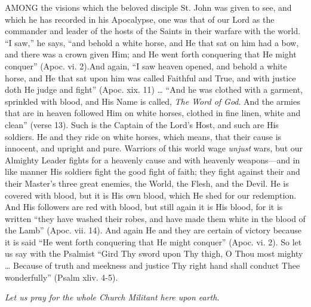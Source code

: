 AMONG the visions
which the beloved disciple St. John was given to see, and which he has
recorded in his Apocalypse, one was that of our Lord as the commander
and leader of the hosts of the Saints in their warfare with the world. ``I
saw,'' he says, ``and behold a white horse, and He that sat on him had a
bow, and there was a crown given Him; and He went forth conquering that
He might conquer'' (Apoc. vi. 2).\emph{}And again, ``I saw heaven opened,
and behold a white horse, and He that sat upon him was called Faithful
and True, and with justice doth He judge and fight'' (Apoc. xix. 11) … ``And
he was clothed with a garment, sprinkled with blood, and His Name is
called, \emph{The Word of God}. And the armies that are in heaven
followed Him on white horses, clothed in fine linen, white and clean''
(verse 13). Such is the Captain of the Lord's Host, and such are His
soldiers. He and they ride on white horses, which means, that their
cause is innocent, and upright and pure. Warriors of this world wage \emph{unjust}
wars, but our Almighty Leader fights for a heavenly cause and with
heavenly weapons—and in like manner His soldiers fight the good fight
of faith; they fight against their and their Master's three great
enemies, the World, the Flesh, and the Devil. He is covered with blood,
but it is His own blood, which He shed for our redemption. And His
followers are red with blood, but still again it is His blood, for it is
written ``they have washed their robes, and have made them white in the
blood of the Lamb'' (Apoc. vii. 14). And again He and they are certain of
victory because it is said ``He went forth conquering that He might
conquer'' (Apoc. vi. 2). So let us say with the Psalmist ``Gird Thy sword
upon Thy thigh, O Thou most mighty … Because of truth and meekness and
justice Thy right hand shall conduct Thee wonderfully'' (Psalm xliv.
4-5).

\emph{Let us pray for the whole
Church Militant here upon earth}.

